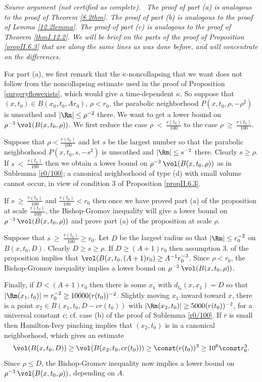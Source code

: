 \par\medskip\noindent\textit{Source argument (not certified as complete).}\ \begingroup\itshape
The proof of part (a) is analogous to the proof of
Theorem \ref{8.2thm}. The proof of part (b) is analogous to
the proof of Lemma \ref{12.2lemma}. The proof of part (c) is analogous
to the proof of Theorem \ref{thmI.12.2}.
We will be brief on the parts of the proof of Proposition \ref{propII.6.3}
that are along the same lines as was done before, and will
concentrate on the differences.


For part (a),
we first remark
 that the $\kappa$-noncollapsing that we want does not follow from
the noncollapsing estimate used in the proof of Proposition
\ref{surgeryflowexists}, which would give a
time-dependent $\kappa$.
So suppose that $(x,t_0) \in B(x_0, t_0, Ar_0)$, $\rho < r_0$,
the parabolic neighborhood $P(x, t_0, \rho, - \rho^2)$ is
unscathed and $|\Rm| \le \rho^{-2}$ there. We want to get
a lower bound on $\rho^{-3} \: \vol(B(x, t_0, \rho))$.
We first reduce the case $\rho \: < \: \frac{r(t_0)}{100}$ to the
case $\rho \:\geq\: \frac{r(t_0)}{100}$.

Suppose that $\rho <
\frac{r(t_0)}{100}$ and let $s$ be the largest
number so that the parabolic neighborhood
$P(x, t_0, s, - s^2)$ is unscathed and $|\Rm| \le s^{-2}$ there.
Clearly $s \ge \rho$.
If $s \: < \: \frac{r(t_0)}{100}$ then we obtain a lower
bound on $\rho^{-3} \: \vol(B(x, t_0, \rho))$
as in Sublemma \ref{r0/100};
a canonical
neighborhood of type (d) with small volume cannot occur,
in view of condition 3 of Proposition \ref{propII.6.3}.

If $s \: \ge \: \frac{r(t_0)}{100}$ and $\frac{r(t_0)}{100} < r_0$
then once we have proved part (a) of the
proposition at scale $\frac{r(t_0)}{100}$, the Bishop-Gromov
inequality will give a lower bound on $\rho^{-3} \: \vol(B(x, t_0, \rho))$
and prove part (a) of the proposition at scale $\rho$.

Suppose that
$s \: \ge \: \frac{r(t_0)}{100} \ge r_0$. Let $D$ be the largest
radius so that $|\Rm| \le r_0^{-2}$ on $B(x,t_0, D)$.
Clearly $D \ge s \ge \rho$.
If $D \ge
(A+1) r_0$ then assumption 3. of the proposition implies that
$\vol(B(x,t_0,(A+1)r_0) \ge A^{-1} r_0^{-3}$. Since $\rho < r_0$,
the Bishop-Gromov inequality implies a lower bound on
$\rho^{-3} \: \vol(B(x, t_0, \rho))$.

Finally, if $D < (A+1)r_0$
then there is some $x_1$ with $d_{t_0}(x,x_1) = D$ so that
$|\Rm(x_1,t_0)| = r_0^{-2} \ge 10000 (r(t_0))^{-2}$. Slightly moving
$x_1$ inward toward $x$, there is a point
$x_2 \in B(x_1, t_0, D-cr(t_0))$ with
$|\Rm(x_2,t_0)| \ge 5000 (r(t_0))^{-2}$, for a universal constant $c$;
cf. case (b) of the proof of Sublemma \ref{r0/100}.
If $\overline{r}$ is small then Hamilton-Ivey pinching implies that
$(x_2, t_0)$ is in a canonical neighborhood, which gives an estimate
\begin{equation}
\vol(B(x, t_0, D)) \ge \vol(B(x_2, t_0, cr(t_0))) \ge
\const (r(t_0))^3 \ge 10^6 \const r_0^3.
\end{equation}
Since $\rho \le D$, the Bishop-Gromov inequality now implies a lower bound on
$\rho^{-3} \: \vol(B(x, t_0, \rho))$, depending on $A$.

